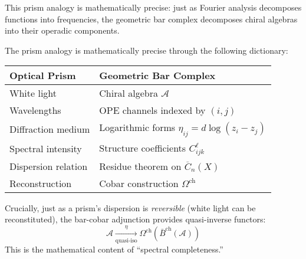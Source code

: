 This prism analogy is mathematically precise: just as Fourier analysis decomposes functions into frequencies, 
the geometric bar complex decomposes chiral algebras into their operadic components.

\begin{remark}
The prism analogy is mathematically precise through the following dictionary:
\begin{center}
\begin{tabular}{|l|l|}
\hline
\textbf{Optical Prism} & \textbf{Geometric Bar Complex} \\
\hline
White light & Chiral algebra $\mathcal{A}$ \\
Wavelengths & OPE channels indexed by $(i,j)$ \\
Diffraction medium & Logarithmic forms $\eta_{ij} = d\log(z_i - z_j)$ \\
Spectral intensity & Structure coefficients $C_{ijk}^\ell$ \\
Dispersion relation & Residue theorem on $\overline{C}_n(X)$ \\
Reconstruction & Cobar construction $\Omega^{\text{ch}}$ \\
\hline
\end{tabular}
\end{center}

Crucially, just as a prism's dispersion is \emph{reversible} (white light can be reconstituted), 
the bar-cobar adjunction provides quasi-inverse functors:
$$\mathcal{A} \xrightarrow[\text{quasi-iso}]{\eta} \Omega^{\text{ch}}(\bar{B}^{\text{ch}}(\mathcal{A}))$$
This is the mathematical content of ``spectral completeness.''
\end{remark}



